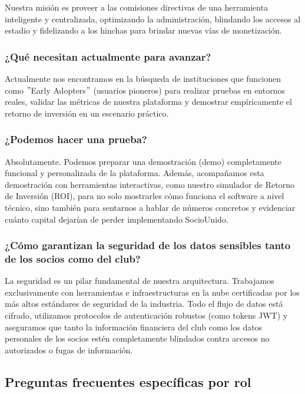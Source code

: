 Nuestra misión es proveer a las comisiones directivas de una herramienta inteligente y centralizada, optimizando la administración, blindando los accesos al estadio y fidelizando a los hinchas para brindar nuevas vías de monetización.

\subsubsection{¿Qué necesitan actualmente para avanzar?}

Actualmente nos encontramos en la búsqueda de instituciones que funcionen como $"$Early Adopters$"$ (usuarios pioneros) para realizar pruebas en entornos reales, validar las métricas de nuestra plataforma y demostrar empíricamente el retorno de inversión en un escenario práctico.

\subsubsection{¿Podemos hacer una prueba?}

Absolutamente. Podemos preparar una demostración (demo) completamente funcional y personalizada de la plataforma. Además, acompañamos esta demostración con herramientas interactivas, como nuestro simulador de Retorno de Inversión (ROI), para no solo mostrarles cómo funciona el software a nivel técnico, sino también para sentarnos a hablar de números concretos y evidenciar cuánto capital dejarían de perder implementando SocioUnido.

\subsubsection{¿Cómo garantizan la seguridad de los datos sensibles tanto de los socios como del club?}

La seguridad es un pilar fundamental de nuestra arquitectura. Trabajamos exclusivamente con herramientas e infraestructuras en la nube certificadas por los más altos estándares de seguridad de la industria. Todo el flujo de datos está cifrado, utilizamos protocolos de autenticación robustos (como tokens JWT) y aseguramos que tanto la información financiera del club como los datos personales de los socios estén completamente blindados contra accesos no autorizados o fugas de información.

\newpage

\subsection{Preguntas frecuentes específicas por rol}

